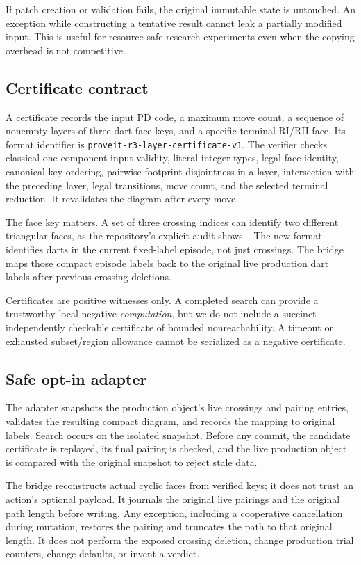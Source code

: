 \documentclass[11pt]{article}
\theoremstyle{definition}
\newcommand{\code}[1]{\texttt{#1}}
\begin{document}
If patch creation or validation fails, the original immutable state is
untouched. An exception while constructing a tentative result cannot leak
a partially modified input. This is useful for resource-safe research
experiments even when the copying overhead is not competitive.

\subsection{Certificate contract}

A certificate records the input PD code, a maximum move count, a sequence
of nonempty layers of three-dart face keys, and a specific terminal RI/RII
face. Its format identifier is
\code{proveit-r3-layer-certificate-v1}. The verifier checks classical
one-component input validity, literal integer types, legal face identity,
canonical key ordering, pairwise footprint disjointness in a layer,
intersection with the preceding layer, legal transitions, move count, and
the selected terminal reduction. It revalidates the diagram after every
move.

The face key matters. A set of three crossing indices can identify two
different triangular faces, as the repository's explicit audit
shows~\cite{repo-causal}. The new format identifies darts in the current
fixed-label episode, not just crossings. The bridge maps those compact
episode labels back to the original live production dart labels after
previous crossing deletions.

Certificates are positive witnesses only. A completed search can provide
a trustworthy local negative \emph{computation}, but we do not include a
succinct independently checkable certificate of bounded nonreachability.
A timeout or exhausted subset/region allowance cannot be serialized as a
negative certificate.

\subsection{Safe opt-in adapter}

The adapter snapshots the production object's live crossings and pairing
entries, validates the resulting compact diagram, and records the mapping
to original labels. Search occurs on the isolated snapshot. Before any
commit, the candidate certificate is replayed, its final pairing is checked,
and the live production object is compared with the original snapshot to
reject stale data.

The bridge reconstructs actual cyclic faces from verified keys; it does
not trust an action's optional payload. It journals the original live
pairings and the original path length before writing. Any exception,
including a cooperative cancellation during mutation, restores the
pairing and truncates the path to that original length. It does not
perform the exposed crossing deletion, change production trial counters,
change defaults, or invent a verdict.
\end{document}

